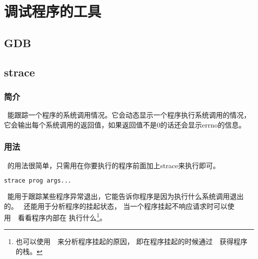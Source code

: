 
\chapter{调试程序的工具}

\section{GDB}

\section{strace}

\subsection{简介}
~能跟踪一个程序的系统调用情况。它会动态显示一个程序执行系统调用的情况，
它会输出每个系统调用的返回值，如果返回值不是0的话还会显示errno的信息。

\subsection{用法}
~的用法很简单，只需用在你要执行的程序前面加上strace来执行即可。

\begin{lstlisting}[language={sh}]
strace prog args...
\end{lstlisting}

~能用于跟踪某些程序异常退出，它能告诉你程序是因为执行什么系统调用退出的。
~还能用于分析程序的挂起状态，
当一个程序挂起不响应请求时可以使用~~看看程序内部在
执行什么\footnote{也可以使用~~来分析程序挂起的原因，
即在程序挂起的时候通过~~获得程序的栈。}。


